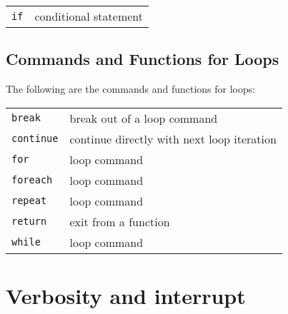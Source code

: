 \documentclass[a4paper]{mybook}
\begin{document}
\begin{center}
\begin{longtable}{ll}
   
{\verb~if~} &
      conditional statement\\
   
\end{longtable}
\end{center}

\noindent



\section{Commands and Functions for Loops}
\label{Commands and Functions for Loops}

        
The following are the commands and functions for loops:

\begin{center}
\begin{longtable}{ll}
   
{\verb~break~} &
      break out of a loop command\\
   
{\verb~continue~} &
      continue directly with next loop iteration\\
   
{\verb~for~} &
      loop command\\
   
{\verb~foreach~} &
      loop command\\
   
{\verb~repeat~} &
      loop command\\
   
{\verb~return~} &
      exit from a function\\
   
{\verb~while~} &
      loop command\\
   
\end{longtable}
\end{center}

\noindent



\chapter{Verbosity and interrupt}
\label{Verbosity and interrupt}

      
\end{document}
